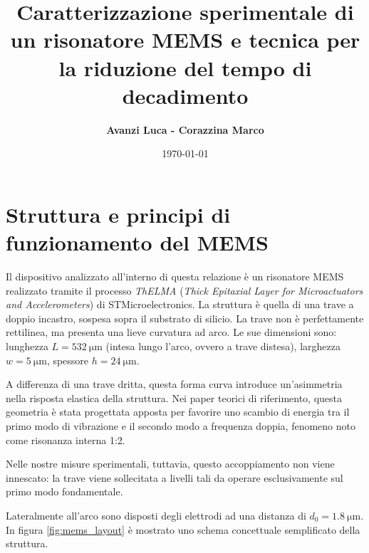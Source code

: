 \documentclass[11pt,a4paper]{article}
\title{\textbf{Caratterizzazione sperimentale di un risonatore MEMS e tecnica per la riduzione del tempo di decadimento}}
\author{\textbf{Avanzi Luca - Corazzina Marco}}
\date{\today}
\begin{document}
\maketitle


\tableofcontents
\newpage

\section{Struttura e principi di funzionamento del MEMS}


Il dispositivo analizzato all'interno di questa relazione è un risonatore MEMS realizzato tramite il processo \textit{ThELMA} (\textit{Thick Epitaxial Layer for Microactuators and Accelerometers}) di STMicroelectronics. La struttura è quella di una trave a doppio incastro, sospesa sopra il substrato di silicio. La trave non è perfettamente rettilinea, ma presenta una lieve curvatura  ad arco. Le sue dimensioni sono: lunghezza $L = \SI{532}{\micro\meter}$ (intesa lungo l'arco, ovvero a trave distesa), larghezza $w = \SI{5}{\micro\meter}$, spessore $h = \SI{24}{\micro\meter}$.

\noindent A differenza di una trave dritta, questa forma curva introduce un'asimmetria nella risposta elastica della struttura. Nei paper teorici di riferimento\cite{frangi2023}, questa geometria è stata progettata apposta per favorire uno scambio di energia tra il primo modo di vibrazione e il secondo modo a frequenza doppia, fenomeno noto come risonanza interna 1:2.

\vspace{0.3cm}
\noindent Nelle nostre misure sperimentali, tuttavia, questo accoppiamento non viene innescato: la trave viene sollecitata a livelli tali da operare esclusivamente sul primo modo fondamentale. 

\vspace{0.3cm}
\noindent Lateralmente all'arco sono disposti degli elettrodi ad una distanza di $d_0 = \SI{1.8}{\micro\meter}$. In figura \ref{fig:mems_layout} è mostrato uno schema concettuale semplificato della struttura. 
\end{document}
